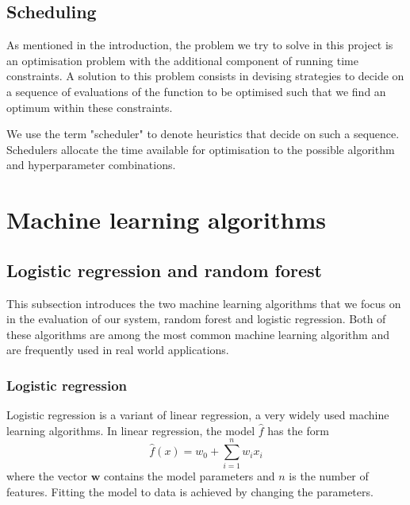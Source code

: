 \documentclass[a4paper,12pt,twoside,openright]{report}
\begin{document}


\subsection{Scheduling}
As mentioned in the introduction, the problem we try to solve in this project is an optimisation problem with the additional component of running time constraints. A solution to this problem consists in devising strategies to decide on a sequence of evaluations of the function to be optimised such that we find an optimum within these constraints. 

We use the term "scheduler" to denote heuristics that decide on such a sequence. Schedulers allocate the time available for optimisation to the possible algorithm and hyperparameter combinations.

\section{Machine learning algorithms}
\subsection{Logistic regression and random forest}
This subsection introduces the two machine learning algorithms that we focus on in the evaluation of our system, random forest and logistic regression. Both of these algorithms are among the most common machine learning algorithm and are frequently used in real world applications. %


\subsubsection{Logistic regression}
Logistic regression is a variant of linear regression, a very widely used machine learning algorithms. In linear regression, the model $\hat{f}$ has the form
\begin{equation}
\hat{f}(x) = w_0 + \sum_{i=1}^n w_ix_i
\end{equation}
where the vector $\mathbf{w}$ contains the model parameters and $n$ is the number of features. Fitting the model to data is achieved by changing the parameters.
\end{document}
